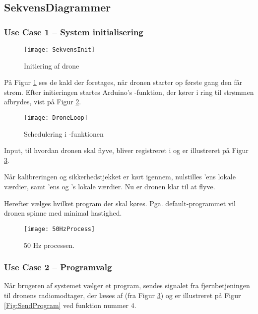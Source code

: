 \documentclass[Main]{subfiles}
\begin{document}
\subsection{SekvensDiagrammer}

\subsubsection{Use Case 1 -- System initialisering}

\begin{figure}[htbp]
\centering
\texttt{[image: SekvensInit]}
\caption{Initiering af drone}
\label{Fig:SekvInit}
\end{figure}

På Figur \ref{Fig:SekvInit} ses de kald der foretages, når dronen starter op første gang den får strøm.
Efter initieringen startes Arduino's -funktion, der kører i ring til strømmen afbrydes, vist på Figur \ref{Fig:SekvDroneHz}.


\begin{figure}[htbp]
\centering
\texttt{[image: DroneLoop]}
\caption{Schedulering i -funktionen}
\label{Fig:SekvDroneHz}
\end{figure}

Input, til hvordan dronen skal flyve, bliver registreret i  og er illustreret på Figur \ref{Fig:50Hz}.

Når kalibreringen og sikkerhedstjekket er kørt igennem, nulstilles 'ens lokale værdier, samt 'ens og 's lokale værdier.
Nu er dronen klar til at flyve.

Herefter vælges hvilket program der skal køres. 
Pga. default-programmet vil dronen spinne med minimal hastighed.

\begin{figure}[htbp]
\centering
\texttt{[image: 50HzProcess]}
\caption{50 Hz processen. }
\label{Fig:50Hz}
\end{figure}




\newpage
\subsubsection{Use Case 2 -- Programvalg}
Når brugeren af systemet vælger et program, sendes signalet fra fjernbetjeningen til dronens radiomodtager, der læses af  (fra Figur \ref{Fig:50Hz}) og er illustreret på Figur \ref{Fig:SendProgram} ved funktion nummer 4.
\end{document}

